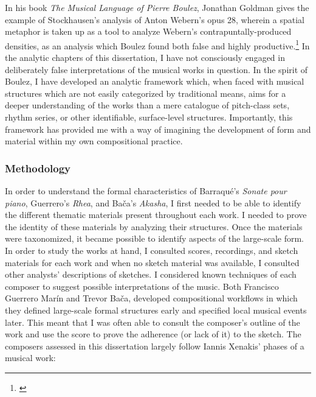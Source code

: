 In his book \emph{The Musical Language of Pierre Boulez}, Jonathan Goldman gives the example of Stockhausen's analysis of Anton Webern's opus 28, wherein a spatial metaphor is taken up as a tool to analyze Webern's contrapuntally-produced densities, as an analysis which Boulez found both false and highly productive.\footnote{\citet[89]{boulez-language}} In the analytic chapters of this dissertation, I have not consciously engaged in deliberately false interpretations of the musical works in question. In the spirit of Boulez, I have developed an analytic framework which, when faced with musical structures which are not easily categorized by traditional means, aims for a deeper understanding of the works than a mere catalogue of pitch-class sets, rhythm series, or other identifiable, surface-level structures. Importantly, this framework has provided me with a way of imagining the development of form and material within my own compositional practice.

\subsubsection{Methodology}

In order to understand the formal characteristics of Barraqué's \textit{Sonate pour piano}, Guerrero's \textit{Rhea}, and Bača's \textit{Akasha}, I first needed to be able to identify the different thematic materials present throughout each work. I needed to prove the identity of these materials by analyzing their structures. Once the materials were taxonomized, it became possible to identify aspects of the large-scale form. In order to study the works at hand, I consulted scores, recordings, and sketch materials for each work and when no sketch material was available, I consulted other analysts' descriptions of sketches. I considered known techniques of each composer to suggest possible interpretations of the music. Both Francisco Guerrero Marín and Trevor Bača, developed compositional workflows in which they defined large-scale formal structures early and specified local musical events later. This meant that I was often able to consult the composer's outline of the work and use the score to prove the adherence (or lack of it) to the sketch. The composers assessed in this dissertation largely follow Iannis Xenakis' phases of a musical work:


